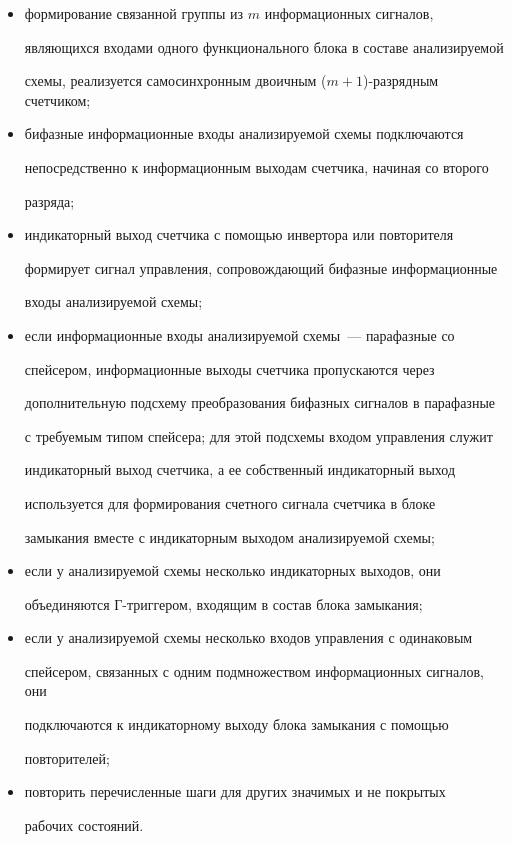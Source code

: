       \begin{itemize}


\item формирование связанной группы из $m$ информационных сигналов, 


являющихся входами одного функционального блока в составе анализируемой 


схемы, реализуется самосинхронным двоичным ($m+1$)-разрядным счетчиком;


\item бифазные информационные входы анализируемой схемы подключаются 


непосредственно к информационным выходам счетчика, начиная со второго 


разряда;


\item индикаторный выход счетчика с помощью инвертора или повторителя 


формирует сигнал управления, сопровождающий бифазные информационные 


входы анализируемой схемы; 


\item если информационные входы анализируемой схемы~--- парафазные со 


спейсером, информационные выходы счетчика пропускаются через 


дополнительную подсхему преобразования бифазных сигналов в парафазные 


с требуемым типом спейсера; для этой подсхемы входом управления служит 


индикаторный выход счетчика, а ее собственный индикаторный выход 


используется для формирования счетного сигнала счетчика в блоке 


замыкания вместе с индикаторным выходом анализируемой схемы;


\item если у анализируемой схемы несколько индикаторных выходов, они 


объединяются Г-триг\-ге\-ром, входящим в состав блока замыкания;


\item если у анализируемой схемы несколько входов управления с одинаковым 


спейсером, связанных с одним подмножеством информационных сигналов, они 


подключаются к индикаторному выходу блока замыкания с помощью 


повторителей;


\item повторить перечисленные шаги для других значимых и не покрытых 


рабочих состояний.


\end{itemize}





